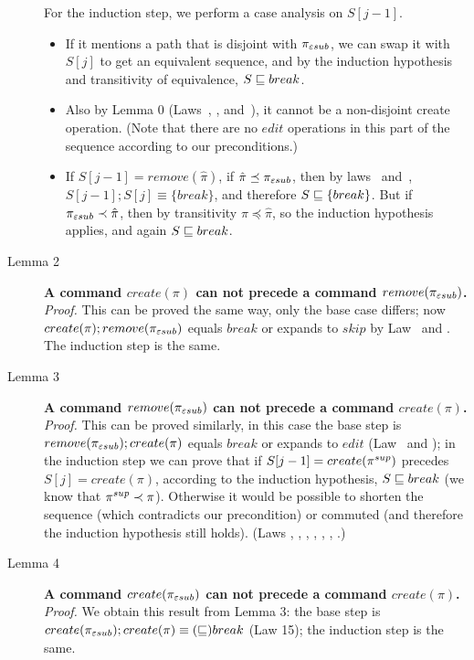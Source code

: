 \begin{description}
For the induction step, we perform a case analysis on \(S[j-1]\).
\begin{itemize}
\item
If it mentions a path that is disjoint with \(\pi_{\varepsilon sub}\),
we can swap it
with \(S[j]\) to get an equivalent sequence, and by the induction   
hypothesis and transitivity of equivalence, \(S\sqsubseteq break\).
\item
Also by Lemma 0 (Laws~\lawxvi, \lawxvii, and~\lawxxvii), it cannot be a
non-disjoint create operation. (Note that there are no \(edit\) operations
in this part of the sequence according to our preconditions.)
\item
If $S[j-1] =remove(\hat\pi)$, if $\hat\pi \preceq \pi_{\varepsilon sub}$, then by laws
\lawxxii~and~\lawxxiii, $S[j-1]; S[j] \equiv \{break\}$, and therefore 
$S\sqsubseteq\{break\}$.
But if $\pi_{\varepsilon sub} \prec \hat\pi$, then by transitivity $\pi \preceq
\hat\pi$, so the induction hypothesis applies, and again 
$S \sqsubseteq break$.
\end{itemize}

\item[Lemma 2]
{\bf A command \(create(\pi)\) can not precede a command  
\(remove(\pi_{\varepsilon sub})\).} 
\emph{Proof.} 
This can be proved the same way, only
the base case differs; now 
\(create(\pi); remove({\pi_{\varepsilon sub}})\) equals \(break\) or expands 
to \(skip\) by Law \lawxvi~and \lawxxvii.
The induction step is the same.

\item[Lemma 3]
{\bf A command \(remove(\pi_{\varepsilon sub})\) can not precede a command
\(create(\pi)\).} 
\emph{Proof.} This can be proved similarly, in this 
case the base step is
\(remove(\pi_{\varepsilon sub}); create({\pi})\) equals \(break\) or
expands to \(edit\) (Law \lawxxi~and \lawxxviii);
in the induction step we can prove that if
\(S[j-1]=create(\pi^{sup})\) precedes \(S[j]=create(\pi)\), according to
the induction hypothesis, \(S\sqsubseteq break\) 
(we know that \(\pi^{sup}\prec\pi\)). Otherwise it would be possible to
shorten the sequence (which contradicts our precondition) or commuted (and therefore the induction hypothesis
still holds). (Laws \lawvii,
\lawviii, \lawxiv, \lawxv, \lawxx, \lawxxi, \lawxxviii.)

\item[Lemma 4]
{\bf A command \(create(\pi_{\varepsilon sub})\) can not precede a command
\(create(\pi)\).} 
\emph{Proof.} 
We obtain this result from Lemma 3: the base step is 
\(create(\pi_{\varepsilon sub}); create({\pi}) \equiv (\sqsubseteq) break\) (Law 15); the
induction step is the same.


\end{description}
